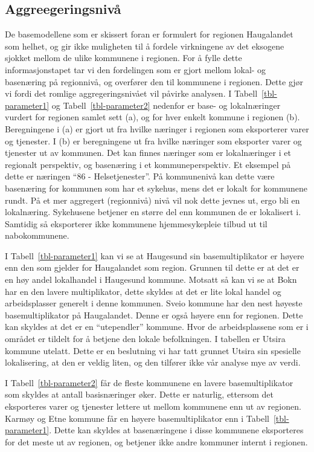 \documentclass[
]{article}
\begin{document}
\hypertarget{aggreegeringsnivuxe5}{%
\subsection{Aggreegeringsnivå}\label{aggreegeringsnivuxe5}}

De basemodellene som er skissert foran er formulert for regionen
Haugalandet som helhet, og gir ikke muligheten til å fordele virkningene
av det eksogene sjokket mellom de ulike kommunene i regionen. For å
fylle dette informasjonstapet tar vi den fordelingen som er gjort mellom
lokal- og basenæring på regionnivå, og overfører den til kommunene i
regionen. Dette gjør vi fordi det romlige aggregeringsnivået vil påvirke
analysen. I Tabell~\ref{tbl-parameter1} og Tabell~\ref{tbl-parameter2}
nedenfor er base- og lokalnæringer vurdert for regionen samlet sett (a),
og for hver enkelt kommune i regionen (b). Beregningene i (a) er gjort
ut fra hvilke næringer i regionen som eksporterer varer og tjenester. I
(b) er beregningene ut fra hvilke næringer som eksporter varer og
tjenester ut av kommunen. Det kan finnes næringer som er lokalnæringer i
et regionalt perspektiv, og basenæring i et kommuneperspektiv. Et
eksempel på dette er næringen ``86 - Helsetjenester''. På kommunenivå
kan dette være basenæring for kommunen som har et sykehus, mens det er
lokalt for kommunene rundt. På et mer aggregert (regionnivå) nivå vil
nok dette jevnes ut, ergo bli en lokalnæring. Sykehusene betjener en
større del enn kommunen de er lokalisert i. Samtidig så eksporterer ikke
kommunene hjemmesykepleie tilbud ut til nabokommunene.

I Tabell~\ref{tbl-parameter1} kan vi se at Haugesund sin
basemultiplikator er høyere enn den som gjelder for Haugalandet som
region. Grunnen til dette er at det er en høy andel lokalhandel i
Haugesund kommune. Motsatt så kan vi se at Bokn har en den lavere
multiplikator, dette skyldes at det er lite lokal handel og
arbeidsplasser generelt i denne kommunen. Sveio kommune har den nest
høyeste basemultiplikator på Haugalandet. Denne er også høyere enn for
regionen. Dette kan skyldes at det er en ``utependler'' kommune. Hvor de
arbeidsplassene som er i området er tildelt for å betjene den lokale
befolkningen. I tabellen er Utsira kommune utelatt. Dette er en
beslutning vi har tatt grunnet Utsira sin spesielle lokalisering, at den
er veldig liten, og den tilfører ikke vår analyse mye av verdi.

I Tabell~\ref{tbl-parameter2} får de fleste kommunene en lavere
basemultiplikator som skyldes at antall basisnæringer øker. Dette er
naturlig, ettersom det eksporteres varer og tjenester lettere ut mellom
kommunene enn ut av regionen. Karmøy og Etne kommune får en høyere
basemultiplikator enn i Tabell~\ref{tbl-parameter1}. Dette kan skyldes
at basenæringene i disse kommunene eksporteres for det meste ut av
regionen, og betjener ikke andre kommuner internt i regionen.
\end{document}
